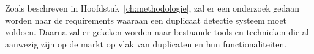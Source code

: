 
\chapter{}%
\label{ch:Onderzoek}

Zoals beschreven in Hoofdstuk~\ref{ch:methodologie}, zal er een onderzoek gedaan worden naar de requirements waaraan een duplicaat detectie systeem moet voldoen. Daarna zal er gekeken worden naar bestaande tools en technieken die al aanwezig zijn op de markt op vlak van duplicaten en hun functionaliteiten. 

\section{}%
\label{sec:requirementsanalyse}

